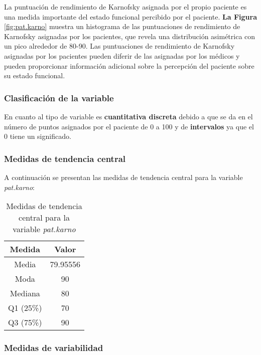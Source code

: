 \documentclass[a4paper,12pt]{article}
\begin{document}
    La puntuación de rendimiento de Karnofsky asignada por el propio paciente es una medida importante del estado funcional percibido por el paciente. \textbf{La Figura }\ref{fig:pat.karno} muestra un histograma de las puntuaciones de rendimiento de Karnofsky asignadas por los pacientes, que revela una distribución asimétrica con un pico alrededor de 80-90. Las puntuaciones de rendimiento de Karnofsky asignadas por los pacientes pueden diferir de las asignadas por los médicos y pueden proporcionar información adicional sobre la percepción del paciente sobre su estado funcional.

    \subsubsection*{Clasificación de la variable}

    En cuanto al tipo de variable es \textbf{cuantitativa discreta} debido a que se da en el número de puntos asignados por el paciente de 0 a 100 y de \textbf{intervalos} ya que el 0 tiene un significado.

    \subsubsection*{Medidas de tendencia central}

    A continuación se presentan las medidas de tendencia central para la variable \textit{pat.karno}:
    
    \begin{table}[h!]
        \centering
        \begin{tabular}{|c|c|}
            \hline
            \textbf{Medida} & \textbf{Valor} \\
            \hline
            Media & 79.95556 \\
            \hline
            Moda & 90 \\
            \hline
            Mediana & 80 \\
            \hline
            Q1 (25\%) & 70 \\
            \hline
            Q3 (75\%) & 90 \\
            \hline
        \end{tabular}
        \caption{Medidas de tendencia central para la variable \textit{pat.karno}}
        \label{tab:medidas_tendencia_central_pat_karno}
    \end{table}
    
    \newpage

    \subsubsection*{Medidas de variabilidad}
    
\end{document}
